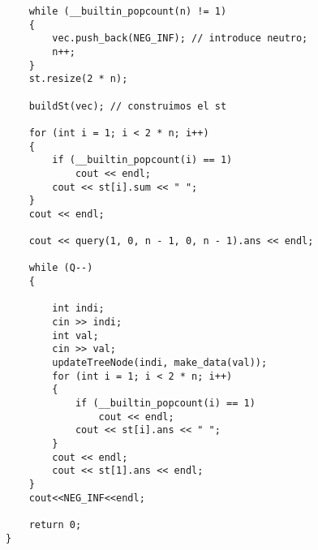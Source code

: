 \begin{lstlisting}
    while (__builtin_popcount(n) != 1)
    {
        vec.push_back(NEG_INF); // introduce neutro;
        n++;
    }
    st.resize(2 * n);

    buildSt(vec); // construimos el st

    for (int i = 1; i < 2 * n; i++)
    {
        if (__builtin_popcount(i) == 1)
            cout << endl;
        cout << st[i].sum << " ";
    }
    cout << endl;

    cout << query(1, 0, n - 1, 0, n - 1).ans << endl;

    while (Q--)
    {

        int indi;
        cin >> indi;
        int val;
        cin >> val;
        updateTreeNode(indi, make_data(val));
        for (int i = 1; i < 2 * n; i++)
        {
            if (__builtin_popcount(i) == 1)
                cout << endl;
            cout << st[i].ans << " ";
        }
        cout << endl;
        cout << st[1].ans << endl;
    }
    cout<<NEG_INF<<endl;

    return 0;
}\end{lstlisting}

